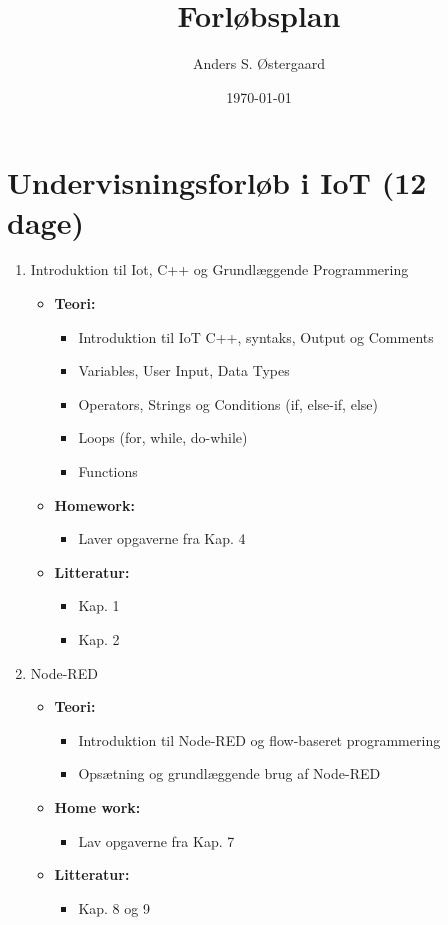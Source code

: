 \documentclass[12pt,a4paper]{article}
\title{Forløbsplan}
\author{Anders S. Østergaard}
\date{\today}
\begin{document}
	\maketitle
	\thispagestyle{empty}
	
\section*{Undervisningsforløb i IoT (12 dage)}
\begin{enumerate}[leftmargin=*, label=\textbf{Dag \arabic* (3 timer)}]
	
	\item Introduktion til Iot, C++ og Grundlæggende Programmering
	\begin{itemize}
		\item \textbf{Teori:}
		\begin{itemize}
			\item Introduktion til IoT C++, syntaks, Output og Comments 
			\item Variables, User Input, Data Types
			\item Operators, Strings og Conditions (if, else-if, else)
			\item Loops (for, while, do-while)
			\item Functions
		\end{itemize}
		\item \textbf{Homework:}
		\begin{itemize}
			\item Laver opgaverne fra Kap. 4 
		\end{itemize}
		\item \textbf{Litteratur:}
		\begin{itemize}
			\item Kap. 1
			\item Kap. 2
		\end{itemize}
	\end{itemize}
	
	\item Node-RED
	\begin{itemize}
		\item \textbf{Teori:}
		\begin{itemize}
			\item Introduktion til Node-RED og flow-baseret programmering
			\item Opsætning og grundlæggende brug af Node-RED
		\end{itemize}
		\item \textbf{Home work:}
		\begin{itemize}
			\item Lav opgaverne fra Kap. 7
		\end{itemize}
		\item \textbf{Litteratur:}
		\begin{itemize}
			\item Kap. 8 og 9
		\end{itemize}
	\end{itemize}
	

\end{enumerate}
\end{document}
